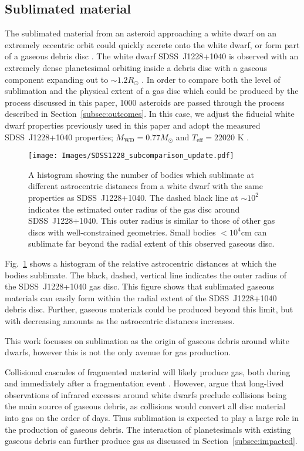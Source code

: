\documentclass[fleqn,usenatbib]{mnras}
\begin{document}
\subsection{Sublimated material} \label{subsec:sublimated}
The sublimated material from an asteroid approaching a white dwarf on an extremely eccentric orbit could quickly accrete onto the white dwarf, or form part of a gaseous debris disc \citep{Trevascus2021}.
The white dwarf SDSS~J1228+1040 is observed with an extremely dense planetesimal orbiting inside a debris disc with a gaseous component expanding out to $\sim 1.2 R_\odot$ \citep{Gansicke2006, Manser2019}.
In order to compare both the level of sublimation and the physical extent of a gas disc which could be produced by the process discussed in this paper, 1000 asteroids are passed through the process described in Section~\ref{subsec:outcomes}.
In this case, we adjust the fiducial white dwarf properties previously used in this paper and adopt the measured SDSS~J1228+1040 properties; $M_\text{WD} = 0.77M_\odot$ and $T_\text{eff} = 22020$ K \citep{Gansicke2006}.
\begin{figure} %
	\texttt{[image: Images/SDSS1228\_subcomparison\_update.pdf]}
    \caption{A histogram showing the number of bodies which sublimate at different astrocentric distances from a white dwarf with the same properties as SDSS~J1228+1040. The dashed black line at $\sim 10^2$ indicates the estimated outer radius of the gas disc around SDSS~J1228+1040. This outer radius is similar to those of other gas discs with well-constrained geometries. Small bodies $< 10^4$cm can sublimate far beyond the radial extent of this observed gaseous disc.}
    \label{fig:SDSS1228_compar}
\end{figure}
Fig.~\ref{fig:SDSS1228_compar} shows a histogram of the relative astrocentric distances at which the bodies sublimate. 
The black, dashed, vertical line indicates the outer radius of the SDSS~J1228+1040 gas disc. 
This figure shows that sublimated gaseous materials can easily form within the radial extent of the SDSS~J1228+1040 debris disc. 
Further, gaseous materials could be produced beyond this limit, but with decreasing amounts as the astrocentric distances increases.

This work focusses on sublimation as the origin of gaseous debris around white dwarfs, however this is not the only avenue for gas production. 

Collisional cascades of fragmented material will likely produce gas, both during and immediately after a fragmentation event \citep{Kenyon2017}. 
However, \cite*{Metzger2012} argue that long-lived observations of infrared excesses around white dwarfs preclude collisions being the main source of gaseous debris, as collisions would convert all disc material into gas on the order of days. 
Thus sublimation is expected to play a large role in the production of gaseous debris. 
The interaction of planetesimals with existing gaseous debris can further produce gas as discussed in Section~\ref{subsec:impacted}.
\end{document}
